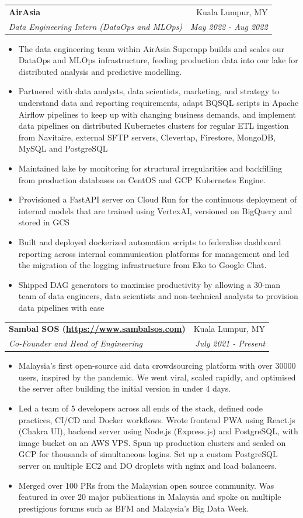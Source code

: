 \documentclass[letterpaper,11pt]{article}
\makeatletter
\newcommand{\resumeItem}[1]{
  \item{
    {#1 \vspace{-2pt}}
  }
}
\newcommand{\resumeSubheading}[4]{
  \vspace{-1pt}\item
    \begin{tabular*}{0.97\textwidth}[t]{l@{\extracolsep{\fill}}r}
      \textbf{#1} & \small{#2} \\
      \textit{#3} & \textit{#4} \\
    \end{tabular*}\vspace{-6pt}
}
\newcommand{\resumeItemListStart}{\begin{itemize}}
\newcommand{\resumeItemListEnd}{\end{itemize}\vspace{-5pt}}
\makeatother
\begin{document}
  \resumeSubheading
  {AirAsia}{Kuala Lumpur, MY}
  {\textit{Data Engineering Intern (DataOps and MLOps)}}{May 2022 - Aug 2022}
  \resumeItemListStart
    \resumeItem{The data engineering team within AirAsia Superapp builds and scales our DataOps and MLOps infrastructure, feeding production data into our lake for distributed analysis and predictive modelling.}
    \resumeItem{Partnered with data analysts, data scientists, marketing, and strategy to understand data and reporting requirements, adapt BQSQL scripts in Apache Airflow pipelines to keep up with changing business demands, and implement data pipelines on distributed Kubernetes clusters for regular ETL ingestion from Navitaire, external SFTP servers, Clevertap, Firestore, MongoDB, MySQL and PostgreSQL}
    \resumeItem{Maintained lake by monitoring for structural irregularities and backfilling from production databases on CentOS and GCP Kubernetes Engine.}
    \resumeItem{Provisioned a FastAPI server on Cloud Run for the continuous deployment of internal models that are trained using VertexAI, versioned on BigQuery and stored in GCS}
    \resumeItem{Built and deployed dockerized automation scripts to federalise dashboard reporting across internal communication platforms for management and led the migration of the logging infrastructure from Eko to Google Chat.}
    \resumeItem{Shipped DAG generators to maximise productivity by allowing a 30-man team of data engineers, data scientists and non-technical analysts to provision data pipelines with ease}
  \resumeItemListEnd

  \resumeSubheading
  {Sambal SOS (\url{https://www.sambalsos.com})}{Kuala Lumpur, MY}
  {\textit{Co-Founder and Head of Engineering}}{July 2021 - Present}
  \resumeItemListStart
    \resumeItem{Malaysia's first open-source aid data crowdsourcing platform with over 30000 users, inspired by the pandemic. We went viral, scaled rapidly, and optimised the server after building the initial version in under 4 days.}
    \resumeItem{Led a team of 5 developers across all ends of the stack, defined code practices, CI/CD and Docker workflows. Wrote frontend PWA using React.js (Chakra UI), backend server using Node.js (Express.js) and PostgreSQL, with image bucket on an AWS VPS.
    Spun up production clusters and scaled on GCP for thousands of simultaneous logins. Set up a custom PostgreSQL server on multiple EC2 and DO droplets with nginx and load balancers.}
    \resumeItem{Merged over 100 PRs from the Malaysian open source community. Was featured in over 20 major publications in Malaysia and spoke on multiple prestigious forums such as BFM and Malaysia's Big Data Week.}
  \resumeItemListEnd
\end{document}
